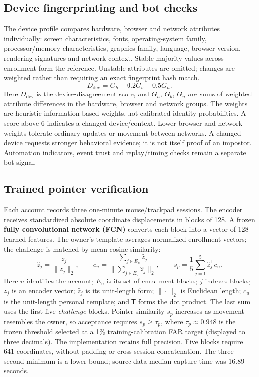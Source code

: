 \documentclass[10pt,a4paper]{article}
\begin{document}
\subsection{Device fingerprinting and bot checks}
The device profile compares hardware, browser and network attributes individually: screen characteristics, fonts, operating-system family, processor/memory characteristics, graphics family, language, browser version, rendering signatures and network context. Stable majority values across enrollment form the reference. Unstable attributes are omitted; changes are weighted rather than requiring an exact fingerprint hash match.
\[
 D_{\mathrm{dev}}=G_h+0.2G_b+0.5G_n .
\]
Here $D_{\mathrm{dev}}$ is the device-disagreement score, and $G_h$, $G_b$, $G_n$ are sums of weighted attribute differences in the hardware, browser and network groups. The weights are heuristic information-based weights, not calibrated identity probabilities. A score above 6 indicates a changed device/context. Lower browser and network weights tolerate ordinary updates or movement between networks. A changed device requests stronger behavioral evidence; it is not itself proof of an impostor. Automation indicators, event trust and replay/timing checks remain a separate bot signal.

\subsection{Trained pointer verification}
Each account records three one-minute mouse/trackpad sessions. The encoder receives standardized absolute coordinate displacements in blocks of 128. A frozen \textbf{fully convolutional network (FCN)} converts each block into a vector of 128 learned features. The owner's template averages normalized enrollment vectors; the challenge is matched by mean cosine similarity:
\[
 \hat z_j=\frac{z_j}{\|z_j\|_2},\qquad
 c_u=\frac{\sum_{j\in E_u}\hat z_j}{\|\sum_{j\in E_u}\hat z_j\|_2},\qquad
 s_p=\frac{1}{5}\sum_{j=1}^{5}\hat z_j^{\mathsf T}c_u .
\]
Here $u$ identifies the account; $E_u$ is its set of enrollment blocks; $j$ indexes blocks; $z_j$ is an encoder vector; $\hat z_j$ is its unit-length form; $\|\cdot\|_2$ is Euclidean length; $c_u$ is the unit-length personal template; and $\mathsf T$ forms the dot product. The last sum uses the first five \emph{challenge} blocks. Pointer similarity $s_p$ increases as movement resembles the owner, so acceptance requires $s_p\geq\tau_p$, where $\tau_p\approx0.948$ is the frozen threshold selected at a 1\% training-calibration FAR target (displayed to three decimals). The implementation retains full precision. Five blocks require 641 coordinates, without padding or cross-session concatenation. The three-second minimum is a lower bound; source-data median capture time was 16.89 seconds.
\end{document}

